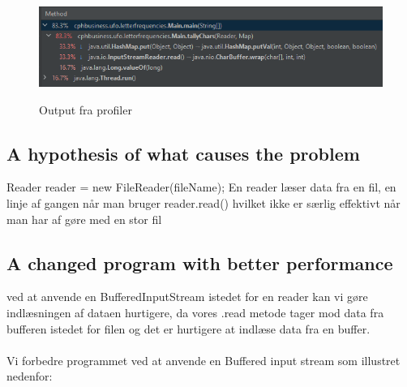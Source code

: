 \documentclass[12pt]{article}
\begin{document}
\begin{figure}[h!]
\begin{center}
\caption{Output fra profiler}
\includegraphics[width=15cm]{før_optimering.PNG}
\label{fig:cclogo}
\end{center}
\label{fig:firstFigureLabel}
\end{figure}




\subsection{A hypothesis of what causes the problem}
Reader reader = new FileReader(fileName);
En reader læser data fra en fil, en linje af gangen når man bruger reader.read() hvilket ikke er særlig effektivt når man har af gøre med en stor fil 

\subsection{A changed program with better performance}
ved at anvende en BufferedInputStream istedet for en reader kan vi gøre indlæsningen af dataen hurtigere, da vores .read metode tager mod data fra bufferen istedet for filen og det er hurtigere at indlæse data fra en buffer. \\ \\

Vi forbedre programmet ved at anvende en Buffered input stream som illustret nedenfor:




\end{document}
